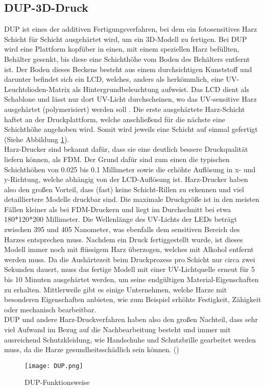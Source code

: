 \subsection{DUP-3D-Druck}
\label{subsec:tDUP}
\ac{DUP} ist eines der additiven Fertigungsverfahren, bei dem ein fotosensitives Harz Schicht für Schicht ausgehärtet wird, um ein \ac{3D}-Modell zu fertigen. Bei \ac{DUP} wird eine Plattform kopfüber in einen, mit einem speziellen Harz befüllten, Behälter gesenkt, bis diese eine Schichthöhe vom Boden des Behälters entfernt ist. Der Boden dieses Beckens besteht aus einem durchsichtigen Kunststoff und darunter befindet sich ein \ac{LCD}, welches, anders als herkömmlich, eine \ac{UV}-Leuchtdioden-Matrix als Hintergrundbeleuchtung aufweist. Das \ac{LCD} dient als Schablone und lässt nur dort \ac{UV}-Licht durchscheinen, wo das \ac{UV}-sensitive Harz ausgehärtet (polymerisiert) werden soll . Die erste ausgehärtete Harz-Schicht haftet an der Druckplattform, welche anschließend für die nächste eine Schichthöhe angehoben wird. Somit wird jeweils eine Schicht auf einmal gefertigt (Siehe Abbildung \ref{fig:DUP}).\\ Harz-Drucker sind bekannt dafür, dass sie eine deutlich bessere Druckqualität liefern können, als \ac{FDM}. Der Grund dafür sind zum einen die typischen Schichthöhen von 0.025 bis 0.1 Millimeter sowie die erhöhte Auflösung in x- und y-Richtung, welche abhängig von der \ac{LCD}-Auflösung ist.  Harz-Drucker haben also den großen Vorteil, dass (fast) keine Schicht-Rillen zu erkennen und viel detailliertere Modelle druckbar sind. Die maximale Druckgröße ist in den meisten Fällen kleiner als bei \ac{FDM}-Druckern und liegt im Durchschnitt bei etwa 180*120*200 Millimeter. Die Wellenlänge des \ac{UV}-Lichts der LEDs beträgt zwischen 395 und 405 Nanometer, was ebenfalls dem sensitiven Bereich des Harzes entsprechen muss. Nachdem ein Druck fertiggestellt wurde, ist dieses Modell immer noch mit flüssigem Harz überzogen, welches mit Alkohol entfernt werden muss. Da die Aushärtezeit beim Druckprozess pro Schicht nur circa zwei Sekunden dauert, muss das fertige Modell mit einer \ac{UV}-Lichtquelle erneut für 5 bis 10 Minuten ausgehärtet werden, um seine endgültigen Material-Eigenschaften zu erhalten. Mittlerweile gibt es einige Unternehmen, welche Harze mit besonderen Eigenschaften anbieten, wie zum Beispiel erhöhte Festigkeit, Zähigkeit oder mechanisch bearbeitbar.\\
\ac{DUP} und andere Harz-Druckverfahren haben also den großen Nachteil, dass sehr viel Aufwand im Bezug auf die Nachbearbeitung besteht und immer mit ausreichend Schutzkleidung, wie Handschuhe und Schutzbrille gearbeitet werden muss, da die Harze gesundheitsschädlich sein können. (\cite{druckwegeDUP})
\begin{figure}[h]
\centering
\texttt{[image: DUP.png]}
\caption{DUP-Funktionsweise}
\label{fig:DUP}
\end{figure}

